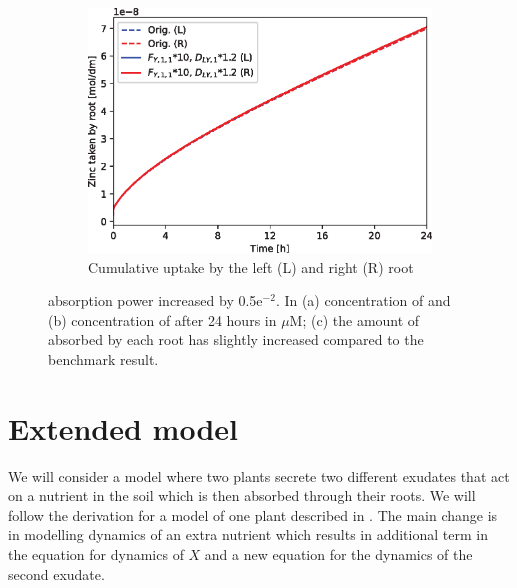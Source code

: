 \documentclass[11pt]{article}
\numberwithin{equation}{section}
\begin{document}
\begin{figure}[h]
\begin{subfigure}[t]{0.31\textwidth}
     \caption{}
     \label{fig:absup_Zn}
     \end{subfigure}
     \begin{subfigure}[t]{0.37\textwidth}
    \includegraphics[width=\textwidth]{Figures/testpics/ZnCumulative/IncreasedZnCumu.eps}
    \caption{Cumulative  uptake by the left (L) and right (R) root}
    \label{fig:absup_cum}
    \end{subfigure}
    \caption{ absorption power increased by 0.5e$^{-2}$. In (a) concentration of  and (b) concentration of  after 24 hours in $\mu$M; (c) the amount of  absorbed by each root has slightly increased compared to the benchmark result.}
\end{figure}


\newpage


\section{Extended model}
\label{sec:Extension}
We will consider a model where two plants secrete two different exudates that act on a nutrient in the soil which is then absorbed through their roots. We will follow the derivation for a model of one plant described in \cite{Ptashnyk-2011}. The main change is in modelling dynamics of an extra nutrient which results in additional term in the equation for dynamics of $X$ and a new equation for the dynamics of the second exudate.
	
\end{document}

